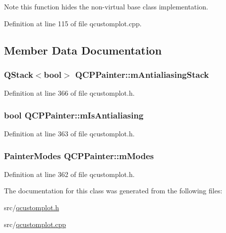 \begin{DoxyNote}{Note}
this function hides the non-\/virtual base class implementation. 
\end{DoxyNote}


Definition at line 115 of file qcustomplot.\-cpp.



\subsection{Member Data Documentation}
\hypertarget{class_q_c_p_painter_a0189e641bbf7dc31ac15aef7b36501fa}{
\subsubsection[{m\-Antialiasing\-Stack}]{\setlength{\rightskip}{0pt plus 5cm}Q\-Stack$<$bool$>$ Q\-C\-P\-Painter\-::m\-Antialiasing\-Stack\hspace{0.3cm}{\ttfamily [protected]}}}\label{class_q_c_p_painter_a0189e641bbf7dc31ac15aef7b36501fa}


Definition at line 366 of file qcustomplot.\-h.

\hypertarget{class_q_c_p_painter_a7055085da176aee0f6b23298f1003d08}{
\subsubsection[{m\-Is\-Antialiasing}]{\setlength{\rightskip}{0pt plus 5cm}bool Q\-C\-P\-Painter\-::m\-Is\-Antialiasing\hspace{0.3cm}{\ttfamily [protected]}}}\label{class_q_c_p_painter_a7055085da176aee0f6b23298f1003d08}


Definition at line 363 of file qcustomplot.\-h.

\hypertarget{class_q_c_p_painter_af5d1d6e5df0adbc7de5633250fb3396c}{
\subsubsection[{m\-Modes}]{\setlength{\rightskip}{0pt plus 5cm}Painter\-Modes Q\-C\-P\-Painter\-::m\-Modes\hspace{0.3cm}{\ttfamily [protected]}}}\label{class_q_c_p_painter_af5d1d6e5df0adbc7de5633250fb3396c}


Definition at line 362 of file qcustomplot.\-h.



The documentation for this class was generated from the following files\-:\begin{DoxyCompactItemize}
\item 
src/\hyperlink{qcustomplot_8h}{qcustomplot.\-h}\item 
src/\hyperlink{qcustomplot_8cpp}{qcustomplot.\-cpp}\end{DoxyCompactItemize}
